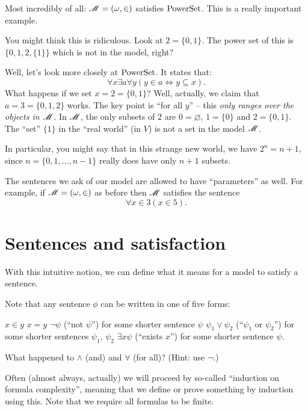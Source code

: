\begin{example}
	Most incredibly of all: $\mathscr M = (\omega, \in)$ satisfies $\mathrm{PowerSet}$.
	This is a really important example.

	You might think this is ridiculous. Look at $2 = \{0,1\}$.
	The power set of this is $\{0, 1, 2, \{1\}\}$ which is not in the model, right?

	Well, let's look more closely at $\mathrm{PowerSet}$. It states that:
	\[ \forall x \exists a \forall y (y \in a \iff y \subseteq x). \]
	What happens if we set $x = 2 = \{0,1\}$?
	Well, actually, we claim that $a = 3 = \{0,1,2\}$ works.
	The key point is ``for all $y$'' -- this \emph{only ranges over the objects in $\mathscr M$}.
	In $\mathscr M$, the only subsets of $2$ are $0 = \varnothing$,
	$1 = \{0\}$ and $2 = \{0,1\}$.
	The ``set'' $\{1\}$ in the ``real world'' (in $V$) is not a set in the model $\mathscr M$.

	In particular, you might say that in this strange new world,
	we have $2^n = n+1$, since $n = \{0,1,\dots,n-1\}$ really does
	have only $n+1$ subsets.
\end{example}

\begin{example}
	The sentences we ask of our model are allowed to have ``parameters'' as well.
	For example, if $\mathscr M = (\omega, \in)$ as before then $\mathscr M$ satisfies the sentence
	\[ \forall x \in 3 (x \in 5). \]
\end{example}

\section{Sentences and satisfaction}
With this intuitive notion, we can define what it means for a model to satisfy a sentence.
\begin{definition}
Note that any sentence $\phi$ can be written in one of five forms:
\begin{itemize}
	\ii $x \in y$
	\ii $x = y$
	\ii $\neg \psi$ (``not $\psi$'') for some shorter sentence $\psi$
	\ii $\psi_1 \lor \psi_2$ (``$\psi_1$ or $\psi_2$'')
	for some shorter sentences $\psi_1$, $\psi_2$
	\ii $\exists x \psi$ (``exists $x$'') for some shorter sentence $\psi$.
\end{itemize}
\end{definition}
\begin{ques}
	What happened to $\land$ (and) and $\forall$ (for all)?
	(Hint: use $\neg$.)
\end{ques}
Often (almost always, actually) we will proceed by so-called ``induction on formula complexity'',
meaning that we define or prove something by induction using this.
Note that we require all formulas to be finite.

